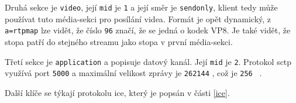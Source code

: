 Druhá sekce je \texttt{video}, její \texttt{mid} je
\texttt{1} a její směr je \texttt{sendonly}, klient tedy
může používat tuto média-sekci pro posílání videa. Formát je opět dynamický, z
\texttt{a=rtpmap} lze vidět, že číslo \texttt{96} značí, že
se jedná o kodek VP8. Je také vidět, že stopa patří do stejného streamu jako
stopa v první média-sekci.

Třetí sekce je \texttt{application} a popisuje datový kanál. Její
\texttt{mid} je \texttt{2}. Protokol \gls{sctp} využívá port
\texttt{5000} a maximální velikost zprávy je \texttt{262144}
\si{\byte}, což je \texttt{256} \si{\kibi\byte}.

Další klíče se týkají protokolu \gls{ice}, který je popsán v části \ref{ice}.
